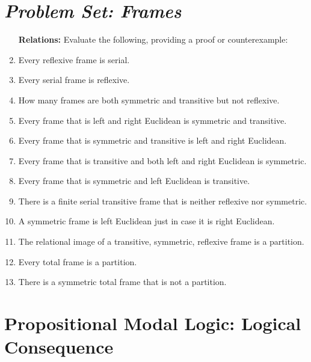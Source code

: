 \documentclass[a4paper, 11pt]{article} %
\begin{document}
\section*{\it Problem Set: Frames}

\begin{enumerate}[leftmargin=1.2in,itemsep=1pt]\small
	\item[\bf Relations:] Evaluate the following, providing a proof or counterexample:
    \item Every reflexive frame is serial.
    \item Every serial frame is reflexive.
    \item How many frames are both symmetric and transitive but not reflexive.
    \item Every frame that is left and right Euclidean is symmetric and transitive.
    \item Every frame that is symmetric and transitive is left and right Euclidean.
    \item Every frame that is transitive and both left and right Euclidean is symmetric.
    \item Every frame that is symmetric and left Euclidean is transitive.
    \item There is a finite serial transitive frame that is neither reflexive nor symmetric.
    \item A symmetric frame is left Euclidean just in case it is right Euclidean.
    \item The relational image of a transitive, symmetric, reflexive frame is a partition.
    \item Every total frame is a partition.
    \item There is a symmetric total frame that is not a partition.
\end{enumerate}




\section*{\sc Propositional Modal Logic: Logical Consequence}
\end{document}
